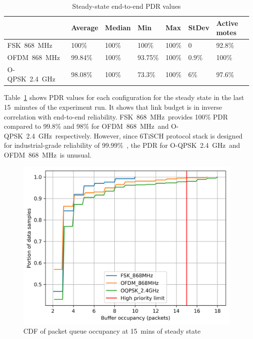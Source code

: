 \documentclass[journal,article,submit,moreauthors,pdftex]{Definitions/mdpi}
\newcommand{\fsk}          {FSK~868~MHz}
\newcommand{\oqpsk}        {O-QPSK~2.4~GHz}
\newcommand{\ofdm}         {OFDM~868~MHz}
\begin{document}
\begin{table}[]
\centering
\begin{tabular}{|l|l|l|l|l|l|l|}
\hline
        & Average & Median & Min     & Max   & StDev & Active motes \\ \hline
\fsk\   & 100\%   & 100\%  & 100\%   & 100\% & 0     & 92.8\%     \\ \hline
\ofdm\  & 99.84\% & 100\%  & 93.75\% & 100\% & 0.9\% & 100\%      \\ \hline
\oqpsk\ & 98.08\% & 100\%  & 73.3\%  & 100\% & 6\%   & 97.6\%     \\ \hline
\end{tabular}
\caption{Steady-state end-to-end PDR values}
\label{tab:pdr_table}
\end{table}


Table~\ref{tab:pdr_table} shows PDR values for each configuration for the steady state in the last 15~minutes of the experiment run. 
It shows that link budget is in inverse correlation with end-to-end reliability.
\fsk\ provides 100\% PDR compared to 99.8\% and 98\% for \ofdm\ and \oqpsk\ respectively.
However, since 6TiSCH protocol stack is designed for industrial-grade reliability of 99.99\%~\cite{vucinic20key}, the PDR for \oqpsk\ and \ofdm\ is unusual.

\begin{figure}
	\centering
	\includegraphics[width=0.90\columnwidth]{maxBufferSize_cdf_plot_full_steady_15}
	\caption{CDF of packet queue occupancy at 15~mins of steady state}
    \label{fig:maxBufferSize_cdf_plot_full_steady_15}
\end{figure}
\end{document}
